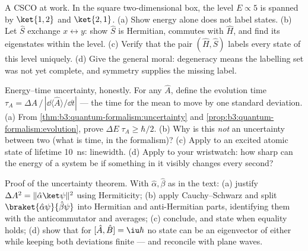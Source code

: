 \begin{exercise}[$\star\star$]\label{exo:b3:quantum-formalism:9}
A CSCO at work. In the square two-dimensional box, the level $E
\propto 5$ is spanned by $\ket{1,2}$ and $\ket{2,1}$. (a) Show
energy alone does not label states. (b) Let $\hat S$ exchange $x
\leftrightarrow y$: show $\hat S$ is Hermitian, commutes with $\hat
H$, and find its eigenstates within the level. (c) Verify that the pair $(\hat H, \hat S)$ labels
every state of this level uniquely. (d) Give the general moral:
degeneracy means the labelling set was not yet complete, and
symmetry supplies the missing label.
\end{exercise}

\begin{exercise}[$\star\star\star$]\label{exo:b3:quantum-formalism:10}
Energy--time uncertainty, honestly. For any  $\hat A$,
define the evolution time $\tau_A = \Delta A\,/\,|\dd\langle\hat
A\rangle/\dd t|$ --- the time for the mean to move by one standard
deviation. (a) From \cref{thm:b3:quantum-formalism:uncertainty} and
\cref{prop:b3:quantum-formalism:evolution}, prove $\Delta
E\;\tau_A \ge \hbar/2$. (b) Why is this \emph{not} an uncertainty
between two  (what is time, in the formalism)? (c) Apply
to an excited atomic state of lifetime \qty{10}{ns}: linewidth. (d)
Apply to your wristwatch: how sharp can the energy of a system be if
something in it visibly changes every second?
\end{exercise}

\begin{exercise}[$\star\star\star$]\label{exo:b3:quantum-formalism:11}
Proof of the uncertainty theorem. With $\hat\alpha, \hat\beta$ as in
the text: (a) justify $\Delta A^2 = \|\hat\alpha\ket\psi\|^2$ using
Hermiticity; (b) apply Cauchy--Schwarz and split
$\braket{\hat\alpha\psi}{\hat\beta\psi}$ into Hermitian and
anti-Hermitian parts, identifying them with the anticommutator and
 averages; (c) conclude, and state when equality holds;
(d) show that for $[\hat A, \hat B] = \iu\hbar$ no state can be an
eigenvector of either  while keeping both deviations
finite --- and reconcile with plane waves.
\end{exercise}

